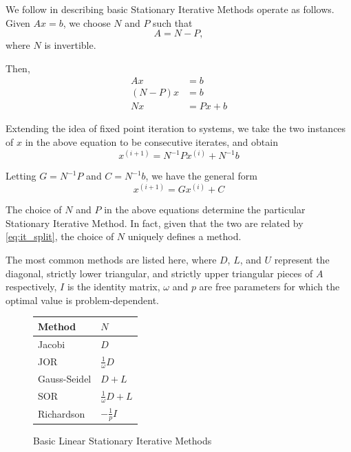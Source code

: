 \documentclass[10pt]{article}
\newcommand{\iter}[1]{^{(#1)}}
\begin{document}
\begin{multicols}{2}
We follow \citet[Section 1.1]{anderson_analysis_2012} in describing basic Stationary Iterative Methods operate as follows.
Given $Ax = b$, we choose $N$ and $P$ such that 
\begin{equation}
	A = N-P,
	\label{eq:it_split}
\end{equation}
where $N$ is invertible.

Then,
\begin{align*}
    Ax &= b \\
    (N-P)x &= b \\
    Nx &= Px + b
\end{align*}

Extending the idea of fixed point iteration to systems, we take the two instances of $x$ in the above equation to be consecutive iterates, and obtain
\begin{equation}
    x\iter{i+1} = N^{-1}Px\iter{i} + N^{-1}b
    \label{eq:it_np}
\end{equation}

Letting $G=N^{-1}P$ and $C=N^{-1}b$, we have the general form
\begin{equation}
    x\iter{i+1} = Gx\iter{i} + C
    \label{eq:it_g}
\end{equation}

The choice of $N$ and $P$ in the above equations determine the particular Stationary Iterative Method.
In fact, given that the two are related by \eqref{eq:it_split}, the choice of $N$ uniquely defines a method.

The most common methods are listed here, where $D$, $L$, and $U$ represent the diagonal, strictly lower triangular, and strictly upper triangular pieces of $A$ respectively, $I$ is the identity matrix, $\omega$ and $p$ are free parameters for which the optimal value is problem-dependent.

\begin{figure}[H]
	\centering
	\begin{tabular}{ll}
		\toprule
		Method & $N$ \\
		\midrule
		Jacobi & $D$ \\
		JOR & $\frac{1}{\omega}D$ \\
		Gauss-Seidel & $D + L$ \\
		SOR & $\frac{1}{\omega}D + L$ \\
		Richardson & $-\frac{1}{p}I$ \\
		\bottomrule
	\end{tabular}
	\caption{Basic Linear Stationary Iterative Methods \citep{young_iterative_1971}}
\end{figure}



\end{multicols}
\end{document}
